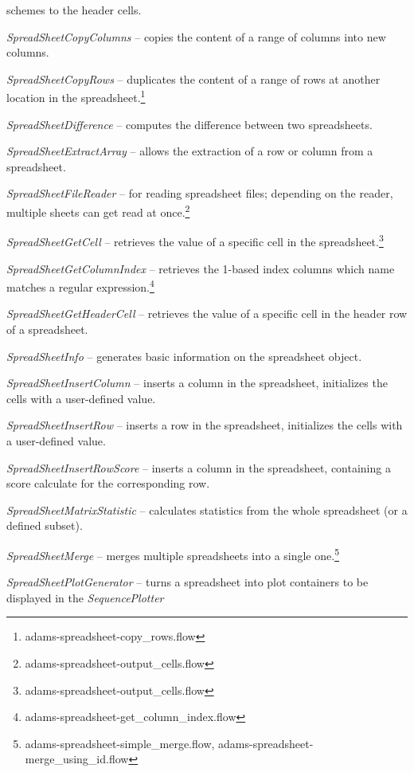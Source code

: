 \documentclass[a4paper]{book}
\begin{document}
\begin{tight_itemize}
	schemes to the header cells.
	\item \textit{SpreadSheetCopyColumns} -- copies the content of a range of
	columns into new columns.
	\item \textit{SpreadSheetCopyRows} -- duplicates the content of a range of
	rows at another location in the spreadsheet.\footnote{adams-spreadsheet-copy\_rows.flow}
	\item \textit{SpreadSheetDifference} -- computes the difference between two
	spreadsheets.
	\item \textit{SpreadSheetExtractArray} -- allows the extraction of a
	row or column from a spreadsheet.
	\item \textit{SpreadSheetFileReader} -- for reading spreadsheet
	files; depending on the reader, multiple sheets can get read at 
	once.\footnote{adams-spreadsheet-output\_cells.flow}
	\item \textit{SpreadSheetGetCell} -- retrieves the value of a specific cell
	in the spreadsheet.\footnote{adams-spreadsheet-output\_cells.flow}
	\item \textit{SpreadSheetGetColumnIndex} -- retrieves the 1-based index columns
	which name matches a regular expression.\footnote{adams-spreadsheet-get\_column\_index.flow}
	\item \textit{SpreadSheetGetHeaderCell} -- retrieves the value of a specific cell
	in the header row of a spreadsheet.
	\item \textit{SpreadSheetInfo} -- generates basic information on the 
	spreadsheet object.
	\item \textit{SpreadSheetInsertColumn} -- inserts a column in the spreadsheet,
	initializes the cells with a user-defined value.
	\item \textit{SpreadSheetInsertRow} -- inserts a row in the spreadsheet,
	initializes the cells with a user-defined value.
	\item \textit{SpreadSheetInsertRowScore} -- inserts a column in the spreadsheet,
	containing a score calculate for the corresponding row.
	\item \textit{SpreadSheetMatrixStatistic} -- calculates statistics from
	the whole spreadsheet (or a defined subset).
	\item \textit{SpreadSheetMerge} -- merges multiple spreadsheets into a single
	one.\footnote{adams-spreadsheet-simple\_merge.flow, adams-spreadsheet-merge\_using\_id.flow}
	\item \textit{SpreadSheetPlotGenerator} -- turns a spreadsheet into plot
	containers to be displayed in the \textit{SequencePlotter} 

\end{tight_itemize}
\end{document}

